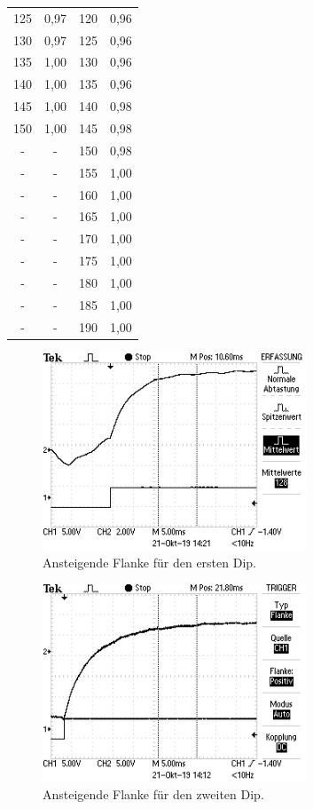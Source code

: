 \begin{table}[htp]
\begin{center}
\begin{tabular}{cccc}
			125 & 0,97 & 120 & 0,96\\
			130 & 0,97 & 125 & 0,96\\
			135 & 1,00 & 130 & 0,96\\
			140 & 1,00 & 135 & 0,96\\
			145 & 1,00 & 140 & 0,98\\
			150 & 1,00 & 145 & 0,98\\
			- & - & 150 & 0,98\\
			- & - & 155 & 1,00\\
			- & - & 160 & 1,00\\
			- & - & 165 & 1,00\\
			- & - & 170 & 1,00\\
			- & - & 175 & 1,00\\
			- & - & 180 & 1,00\\
			- & - & 185 & 1,00\\
			- & - & 190 & 1,00\\
		\bottomrule
		\end{tabular}
	\end{center}
\end{table}

\begin{figure}
  \centering
  \includegraphics[width=0.7\textwidth]{data/Dip1.jpg}
  \caption{Ansteigende Flanke für den ersten Dip.}
  \label{fig:flanke1}
\end{figure}
\begin{figure}
  \centering
  \includegraphics[width=0.7\textwidth]{data/Dip2.jpg}
  \caption{Ansteigende Flanke für den zweiten Dip.}
  \label{fig:flanke2}
\end{figure}

